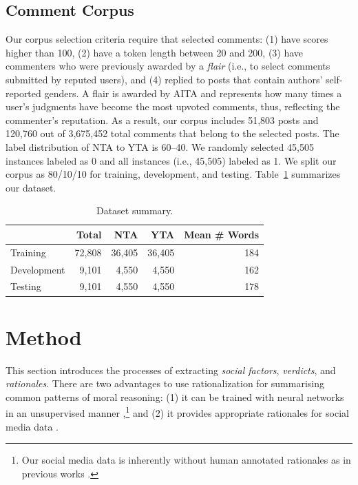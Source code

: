 \documentclass[letterpaper]{article} %
\begin{document}
\subsection{Comment Corpus}

Our corpus selection criteria require that selected comments: (1) have scores higher than 100, (2) have a token length between 20 and 200, (3) have commenters who were previously awarded by a \emph{flair} (i.e., to select comments submitted by reputed users), and (4) replied to posts that contain authors' self-reported genders.
A flair is awarded by AITA and represents how many times a user's judgments have become the most upvoted comments, thus, reflecting the commenter's reputation.
As a result, our corpus includes 51,803 posts and 120,760 out of 3,675,452 total comments that belong to the selected posts.
The label distribution of NTA to YTA is 60--40.
We randomly selected 45,505 instances labeled as 0 and all instances (i.e., 45,505) labeled as 1.
We split our corpus as 80/10/10 for training, development, and testing.
Table~\ref{tab:data_sum} summarizes our dataset.
\begin{table}[htb]
    \centering
    \small
    \begin{tabular}{l r r r r}
    \toprule
    {} &Total& NTA & YTA&Mean \# Words\\
    \midrule
    Training & 72,808 & 36,405 &36,405 &184\\
    Development & 9,101 & 4,550 &4,550 &162\\ 
    Testing & 9,101 & 4,550 &4,550 &178\\
    \bottomrule
    \end{tabular}
    \caption{Dataset summary.}
    \label{tab:data_sum}
\end{table}

\section{Method}

This section introduces the processes of extracting \emph{social factors}, \emph{verdicts}, and \emph{rationales}.
There are two advantages to use rationalization for summarising common patterns of moral reasoning: (1) it can be trained with neural networks in an unsupervised manner \cite{deyoung-2020-eraser},\footnote{Our social media data is inherently without human annotated rationales as in previous works \cite{jain-2019-attention, jain-2020-learning, atanasova-2020-diagnostic}.} and (2) it provides appropriate rationales for social media data \cite{jiang-2021-structurizing}.
\end{document}
